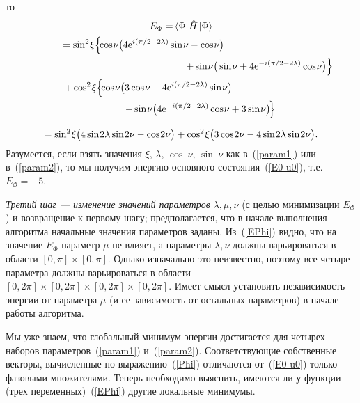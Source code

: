 \documentclass[a4paper]{report}
\newcommand{\ket}[1] {\!\!\;\ensuremath{\left|#1\right\rangle}}
\newcommand{\bra}[1] {\!\!\:\ensuremath{\left\langle#1\right|\!\!\:}}
\begin{document}
то
\begin{multline}\label{EPhi}
E_{\Phi}= \bra\Phi{\hat{H}}\ket\Phi
\\
=\sin^2\:\!\!\xi\!\left\{\!\cos\:\!\!\nu \big(4\mathrm{e}^{i(\pi/2-2\lambda)}\sin\:\!\!\nu- \cos\:\!\!\nu\big) \right.\hspace{7.6em}
\\
\hspace{16em}\left.+\sin\:\!\!\nu\big(\sin\:\!\!\nu+ 4\mathrm{e}^{-i(\pi/2-2\lambda)}\cos\:\!\!\nu\big)\right\}
\\%
+\cos^2\:\!\!\xi\!\left\{\!\cos\:\!\!\nu\big(3\cos\:\!\!\nu- 4\mathrm{e}^{i(\pi/2-2\lambda)}\sin\:\!\!\nu\big) \right.\hspace{6.6em}
\\
\hspace{4em}\left.-\sin\:\!\!\nu\big(4\mathrm{e}^{-i(\pi/2-2\lambda)}\cos\:\!\!\nu+ 3\sin\:\!\!\nu\big)\!\right\}
\vphantom{\underbrace{j_|}}
\\
=\sin^2\:\!\!\xi\big(4\sin\:\!\!2\lambda\sin\:\!\!2\nu- \cos\:\!\!2\nu\big)+
\cos^2\:\!\!\xi\big(3\cos\:\!\!2\nu- 4\sin\:\!\!2\lambda\sin\:\!\!2\nu\big).
\vphantom{\widehat{A^|}}
\end{multline}
Разумеется, если взять значения ${\xi,\, \lambda,\, \cos\:\!\!\nu,\, \sin\:\!\!\nu}$ как в~(\ref{param1}) или в~(\ref{param2}), то мы получим энергию основного состояния~(\ref{E0-u0}), т.е.  $E_{\Phi}=-5$.


\textit{Третий шаг --- изменение значений параметров} $\lambda,\mu,\nu$ (с целью минимизации $E_{\Phi}$) и возвращение к первому шагу; предполагается, что в начале выполнения алгоритма начальные значения параметров заданы. Из~(\ref{EPhi}) видно, что на значение $E_{\Phi}$ параметр $\mu$ не влияет, а параметры $\lambda,\nu$ должны варьироваться в области ${[0,\pi]\times[0,\pi]}$. Однако изначально это неизвестно, поэтому все четыре параметра должны варьироваться в области ${[0,2\pi]\times[0,2\pi]\times[0,2\pi]\times[0,2\pi]}$. Имеет смысл установить независимость энергии от параметра $\mu$ (и ее зависимость от остальных параметров) в начале работы алгоритма.

Мы уже знаем, что глобальный минимум энергии достигается для четырех наборов параметров~(\ref{param1}) и~(\ref{param2}). Соответствующие собственные векторы, вычисленные по выражению~(\ref{Phi}) отличаются от~(\ref{E0-u0}) только фазовыми множителями. Теперь необходимо выяснить, имеются ли у функции (трех переменных)~(\ref{EPhi}) другие локальные минимумы.
\end{document}
